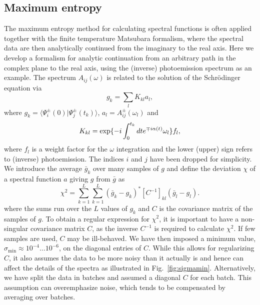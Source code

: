 \subsection{Maximum entropy}
\label{sec:maxent}
The maximum entropy method \cite{maxent,Jarrell} for calculating spectral functions is 
often applied together with the finite temperature Matsubara formalism, where the spectral data 
are then analytically continued from the imaginary to the real axis. Here we develop a 
formalism for analytic continuation from an arbitrary path in the complex
plane to the real axis, using the (inverse) photoemission spectrum as an example. 
The spectrum $A_{ij}(\omega)$ is related to the solution of the Schr\"odinger equation via
\begin{equation}\label{eq:max3}
g_k=\sum_l K_{kl}a_l, 
\end{equation}
where $g_k=\langle \Psi_i^{\pm}(0)|\Psi_j^{\pm}(t_k)\rangle$, $a_l=A_{ij}^{\pm}(\omega_l)$ and                                                           
\begin{equation}\label{eq:max1}
K_{kl}={\rm exp}\lbrace -i\int_0^{t_k}dt e^{\mp i\alpha(t)} \omega_l \rbrace f_l,
\end{equation}
where $f_l$ is a weight factor for the $\omega$ integration and the lower (upper) sign         
refers to (inverse) photoemission. The indices $i$ and $j$ have been dropped for simplicity.
We introduce the average $\bar g_k$ over many samples of $g$ and define the deviation $\chi$ of 
a spectral function $a$ giving $g$ from $\bar g$ as
\begin{equation}\label{eq:8}
\chi^2=\sum_{k=1}^L\sum_{k=1}^L({\bar g}_{k}-g_{k})^{*}[C^{-1}]_{kl}({\bar g}_{l}-g_{l}).
\end{equation}
where the sums run over the $L$ values of $g_k$ and $C$ is the covariance
matrix \cite{maxent,Jarrell} of the samples of $g$. To obtain a regular
expression for $\chi^2$, it is important to have a non-singular covariance
matrix $C$, as the inverse $C^{-1}$ is required to calculate
$\chi^2$. If few samples are used, $C$ may be ill-behaved. We have then imposed
a minimum value, $\sigma_\text{min} \approx 10^{-4}\dots 10^{-6}$, on the
diagonal entries of $C$. While this allows for regularizing $C$, it also
assumes the data to be more noisy than it actually is and hence can
affect the details of the spectra as illustrated in Fig.~\ref{fig:sigmamin}. 
Alternatively, we have split the data in batches and assumed a diagonal $C$
for each batch. This assumption can overemphasize noise, which tends to be 
compensated by averaging over batches.

